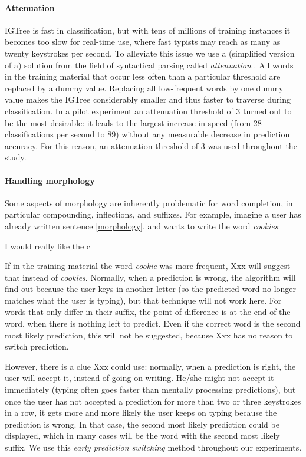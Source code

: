 \documentclass[11pt]{article}
\begin{document}
\paragraph{Attenuation}

IGTree is fast in classification, but with tens of millions of training instances it becomes too slow for real-time use, where fast typists may reach as many as twenty keystrokes per second. To alleviate this issue we  use a (simplified version of a) solution from the field of syntactical parsing called \emph{attenuation} \cite{eisner96}. All words in the training material that occur less often than a particular threshold are replaced by a dummy value. Replacing all low-frequent words by one dummy value makes the IGTree considerably smaller and thus faster to traverse during classification. In a pilot experiment an attenuation threshold of 3 turned out to be the most desirable: it leads to the largest increase in speed (from 28 classifications per second to 89) without any measurable decrease in prediction accuracy. For this reason, an attenuation threshold of 3 was used throughout the study.

\paragraph{Handling morphology} \label{early}

Some aspects of morphology are inherently problematic for word completion, in particular compounding, inflections, and suffixes. For example, imagine a user has already written sentence \ref{morphology}, and wants to write the word \emph{cookies}:

\begin{examples}
\item I would really like the c \label{morphology}
\end{examples}

If in the training material the word \emph{cookie} was more frequent, Xxx will suggest that instead of \emph{cookies}. Normally, when a prediction is wrong, the algorithm will find out because the user keys in another letter (so the predicted word no longer matches what the user is typing), but that technique will not work here. For words that only differ in their suffix, the point of difference is at the end of the word, when there is nothing left to predict. Even if the correct word is the second most likely prediction, this will not be suggested, because Xxx has no reason to switch prediction.

However, there is a clue Xxx could use: normally, when a prediction is right, the user will accept it, instead of going on writing. He/she might not accept it immediately (typing often goes faster than mentally processing predictions), but once the user has not accepted a prediction for more than two or three keystrokes in a row, it gets more and more likely the user keeps on typing because the prediction is wrong. In that case, the second most likely prediction could be displayed, which in many cases will be the word with the second most likely suffix. We use this \emph{early prediction switching} method throughout our experiments.
\end{document}
